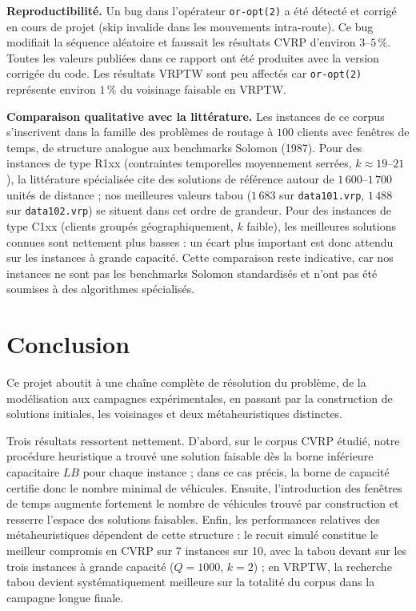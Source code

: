 \documentclass[11pt,a4paper]{article}
\begin{document}
\textbf{Reproductibilité.} Un bug dans l'opérateur \texttt{or-opt(2)} a été détecté et corrigé en cours de projet (skip invalide dans les mouvements intra-route). Ce bug modifiait la séquence aléatoire et faussait les résultats CVRP d'environ $3$--$5\,\%$. Toutes les valeurs publiées dans ce rapport ont été produites avec la version corrigée du code. Les résultats VRPTW sont peu affectés car \texttt{or-opt(2)} représente environ $1\,\%$ du voisinage faisable en VRPTW.

\textbf{Comparaison qualitative avec la littérature.} Les instances de ce corpus s'inscrivent dans la famille des problèmes de routage à $100$ clients avec fenêtres de temps, de structure analogue aux benchmarks Solomon (1987). Pour des instances de type R1xx (contraintes temporelles moyennement serrées, $k\approx 19$--$21$), la littérature spécialisée cite des solutions de référence autour de $1\,600$--$1\,700$ unités de distance ; nos meilleures valeurs tabou ($1\,683$ sur \texttt{data101.vrp}, $1\,488$ sur \texttt{data102.vrp}) se situent dans cet ordre de grandeur. Pour des instances de type C1xx (clients groupés géographiquement, $k$ faible), les meilleures solutions connues sont nettement plus basses : un écart plus important est donc attendu sur les instances à grande capacité. Cette comparaison reste indicative, car nos instances ne sont pas les benchmarks Solomon standardisés et n'ont pas été soumises à des algorithmes spécialisés.

\section{Conclusion}

Ce projet aboutit à une chaîne complète de résolution du problème, de la modélisation aux campagnes expérimentales, en passant par la construction de solutions initiales, les voisinages et deux métaheuristiques distinctes.

Trois résultats ressortent nettement. D'abord, sur le corpus CVRP étudié, notre procédure heuristique a trouvé une solution faisable dès la borne inférieure capacitaire $LB$ pour chaque instance ; dans ce cas précis, la borne de capacité certifie donc le nombre minimal de véhicules. Ensuite, l'introduction des fenêtres de temps augmente fortement le nombre de véhicules trouvé par construction et resserre l'espace des solutions faisables. Enfin, les performances relatives des métaheuristiques dépendent de cette structure : le recuit simulé constitue le meilleur compromis en CVRP sur 7 instances sur 10, avec la tabou devant sur les trois instances à grande capacité ($Q=1000$, $k=2$) ; en VRPTW, la recherche tabou devient systématiquement meilleure sur la totalité du corpus dans la campagne longue finale.
\end{document}
